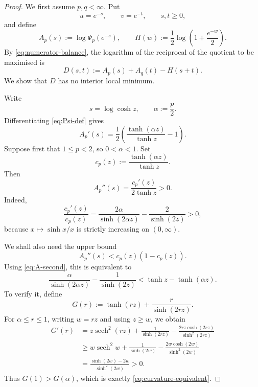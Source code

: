 \documentclass[11pt,reqno]{amsart}
\numberwithin{equation}{section}
\theoremstyle{definition}
\theoremstyle{remark}
\begin{document}
\begin{proof}
We first assume $p,q<\infty$.  Put
\[
  u=e^{-s},\qquad v=e^{-t},\qquad s,t\ge0,
\]
and define
\begin{equation}\label{eq:A-H-def}
  A_p(s):=\log\Psi_p(e^{-s}),
  \qquad
  H(w):=\frac12\log\left(1+\frac{e^{-w}}2\right).
\end{equation}
By \eqref{eq:numerator-balance}, the logarithm of the reciprocal of the quotient to be maximised is
\begin{equation}\label{eq:D-def}
  D(s,t):=A_p(s)+A_q(t)-H(s+t).
\end{equation}
We show that $D$ has no interior local minimum.

Write
\[
  s=\log\cosh z,
  \qquad
  \alpha:=\frac p2.
\]
Differentiating \eqref{eq:Psi-def} gives
\begin{equation}\label{eq:A-prime}
  A_p'(s)
  =\frac12\left(
    \frac{\tanh(\alpha z)}{\tanh z}-1
  \right).
\end{equation}
Suppose first that $1\le p<2$, so $0<\alpha<1$.  Set
\[
  c_p(z):=\frac{\tanh(\alpha z)}{\tanh z}.
\]
Then
\begin{equation}\label{eq:A-second}
  A_p''(s)=\frac{c_p'(z)}{2\tanh z}>0.
\end{equation}
Indeed,
\[
  \frac{c_p'(z)}{c_p(z)}
  =\frac{2\alpha}{\sinh(2\alpha z)}
   -\frac2{\sinh(2z)}>0,
\]
because $x\mapsto\sinh x/x$ is strictly increasing on $(0,\infty)$.

We shall also need the upper bound
\begin{equation}\label{eq:curvature-upper}
  A_p''(s)<c_p(z)(1-c_p(z)).
\end{equation}
Using \eqref{eq:A-second}, this is equivalent to
\begin{equation}\label{eq:curvature-equivalent}
  \frac{\alpha}{\sinh(2\alpha z)}
  -\frac1{\sinh(2z)}
  <\tanh z-\tanh(\alpha z).
\end{equation}
To verify it, define
\[
  G(r):=\tanh(rz)+\frac{r}{\sinh(2rz)}.
\]
For $\alpha\le r\le1$, writing $w=rz$ and using $z\ge w$, we obtain
\begin{align*}
  G'(r)
  &=z\operatorname{sech}^2(rz)
    +\frac1{\sinh(2rz)}
    -\frac{2rz\cosh(2rz)}{\sinh^2(2rz)}\\
  &\ge
    w\operatorname{sech}^2w
    +\frac1{\sinh(2w)}
    -\frac{2w\cosh(2w)}{\sinh^2(2w)}\\
  &=\frac{\sinh(2w)-2w}{\sinh^2(2w)}>0.
\end{align*}
Thus $G(1)>G(\alpha)$, which is exactly \eqref{eq:curvature-equivalent}.


\end{proof}
\end{document}
